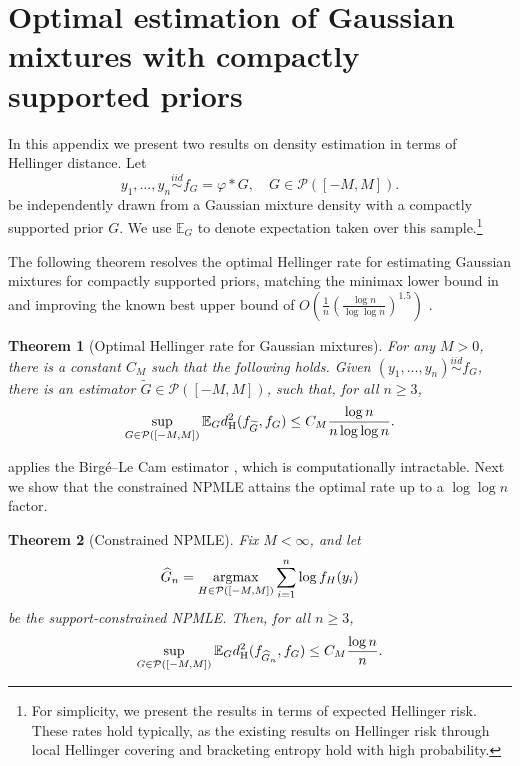 \documentclass[letterpaper,11pt]{article}
\def\argmax{\mathop{\rm argmax}}
\def\simiid{\stackrel{iid}{\sim}}
\newcommand{\Expect}{\mathbb{E}}
\newcommand{\hellinger}{d_{\rm H}}
\newcommand{\calP}{{\mathcal{P}}}
\newtheorem{theorem}{Theorem}
\theoremstyle{definition}
\renewcommand{\hat}{\widehat}
\renewcommand{\tilde}{\widetilde}
\begin{document}
\newcommand{\eps}{\epsilon}
\newcommand{\Hell}{\hellinger}
\newcommand{\coverN}{N}
\newcommand{\bracketN}{N_{[]}}


\section{Optimal estimation of Gaussian mixtures with compactly supported priors}
\label{sec:optimal-density}

In this appendix we present two results on density estimation in terms of Hellinger distance. Let
\[y_1,\ldots, y_n \simiid 
f_G = \varphi * G, \quad G\in\mathcal P([-M,M]).
\]
be independently drawn from a Gaussian mixture density with a compactly supported prior $G$. 
We use $\Expect_{G}$ to denote expectation taken over this sample.\footnote{For simplicity, we present the results in terms of expected Hellinger risk. These rates hold typically, as the existing results on Hellinger risk through local Hellinger covering and bracketing entropy hold with high probability.}


The following theorem resolves the optimal Hellinger rate for estimating Gaussian mixtures for compactly supported priors, matching the minimax lower bound in
\cite[Theorem 20]{polyanskiy2021sharp} and improving the known best upper bound of $O(\frac{1}{n}(\frac{\log n}{\log\log n})^{1.5})$ \cite{NW21}.



\begin{theorem}[Optimal Hellinger rate for Gaussian mixtures]
\label{thm:lcb-risk}
For any $M>0$, there is a constant $C_M$ such that the following holds. 
Given $(y_1,\ldots, y_n) \simiid f_G$, there is an estimator $\tilde G \in
\mathcal P([-M, M])$, such that, for all $n\ge3$,
\[
\sup_{G\in\calP([-M,M])}
\mathbb E_{G}\Hell^2(f_{\tilde G},f_G)
\le
C_M\frac{\log n}{n\log\log n}.
\]
\end{theorem}


 applies the Birg\'e--Le Cam estimator \cite{Birge83}, which is computationally intractable. Next we show that the constrained NPMLE attains the optimal rate up to a $\log\log n$ factor.


\begin{theorem}[Constrained NPMLE]
\label{thm:npmle-risk}
Fix $M<\infty$, and let
\[
\hat G_n=\argmax_{H \in \mathcal P([-M,M])}\sum_{i=1}^n\log f_H(y_i)
\]
be the support-constrained NPMLE.  Then, for all $n\ge3$,
\[
\sup_{G\in\calP([-M,M])}
\mathbb E_{G} \Hell^2(f_{\hat G_n},f_G)
\le
C_M\frac{\log n}{n}.
\]
\end{theorem}
\end{document}
